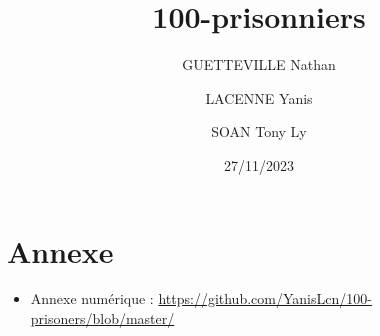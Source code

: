 \documentclass[a4paper]{article}
\title{100-prisonniers}
\date{27/11/2023}
\author{GUETTEVILLE Nathan}
\author{LACENNE Yanis}
\author{SOAN Tony Ly}
\affil{G4S12}
\begin{document}
\maketitle


\tableofcontents

\newpage











\section{Annexe}
\begin{itemize}
	\item Annexe numérique : \url{https://github.com/YanisLcn/100-prisoners/blob/master/}

\end{itemize}


\end{document}
